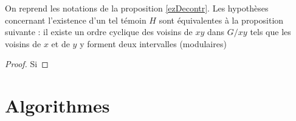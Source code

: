 \documentclass{scrartcl}
\begin{document}
\begin{flushleft}
\begin{lem}
    On reprend les notations de la proposition \ref{ezDecontr}. Les hypothèses concernant l'existence d'un tel témoin $H$ sont équivalentes
    à la proposition suivante : il existe un ordre cyclique des voisins de $xy$ dans $G / xy$ tels que les voisins de $x$ et de $y$
    y forment deux intervalles (modulaires)
\end{lem}

\begin{proof}
    Si 
\end{proof}

\section{Algorithmes}



\end{flushleft}
\end{document}
